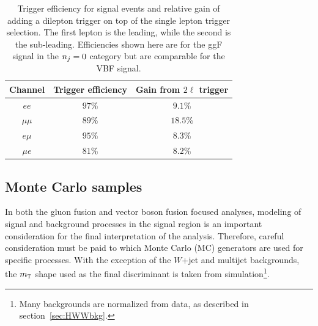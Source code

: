 \begin{table}[h!]
\centering
\captionsetup{justification=centering}

\hspace{-10pt}
\begin{tabular}{|c|c|c|}
\hline
Channel & Trigger efficiency & Gain from $2\ell$ trigger \\ \hline \hline
$ee$ & $97$\% & $9.1$\% \\ \hline
$\mu\mu$ & $89$\% & $18.5$\% \\ \hline
$e\mu$ & $95$\% & $8.3$\% \\ \hline
$\mu e$ & $81$\% & $8.2$\% \\ \hline
\end{tabular}

\caption{
Trigger efficiency for signal events and relative gain of adding a dilepton trigger on top of the single lepton trigger selection. The first lepton is the leading, while the second is the sub-leading. Efficiencies shown here are for the ggF signal in the $n_j = 0$ category but are comparable for the VBF signal. 
}
\label{tab:trigeff}
\end{table}

\subsection{Monte Carlo samples}
\label{sec:HWWMC}

In both the gluon fusion and vector boson fusion focused analyses, modeling of signal and background processes in the signal region is an important consideration for the final interpretation of the analysis. Therefore, careful consideration must be paid to which Monte Carlo (MC) generators are used for specific processes. With the exception of the $W$+jet and multijet backgrounds, the $m_{\textrm{\footnotesize\sc t}}$ shape used as the final discriminant is taken from simulation\footnote{Many backgrounds are normalized from data, as described in section~\ref{sec:HWWbkg}.}. 

